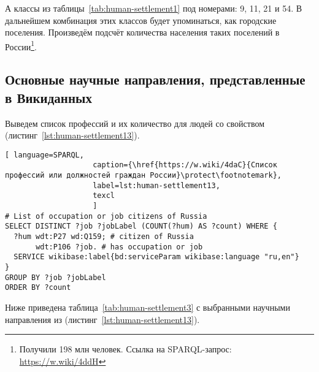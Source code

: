 А классы из таблицы~\ref{tab:human-settlement1} под номерами: 9, 11, 21 и 54. В дальнейшем комбинация этих классов будет упоминаться, как городские поселения. Произведём подсчёт количества населения таких поселений в России\footnote{Получили 198 млн человек. Ссылка на SPARQL-запрос: \href{https://w.wiki/4ddH}{https://w.wiki/4ddH}}.

\subsection{Основные научные направления, представленные в Викиданных}

Выведем список профессий и их количество для людей со свойством   (листинг~\protect\ref{lst:human-settlement13}). 

\lstset{numbers=left, firstnumber=1, frame=single}
\begin{lstlisting}[ language=SPARQL, 
                    caption={\href{https://w.wiki/4daC}{Список профессий или должностей граждан России}\protect\footnotemark},
                    label=lst:human-settlement13,
                    texcl 
                    ]
# List of occupation or job citizens of Russia 
SELECT DISTINCT ?job ?jobLabel (COUNT(?hum) AS ?count) WHERE {
  ?hum wdt:P27 wd:Q159; # citizen of Russia 
       wdt:P106 ?job. # has occupation or job
  SERVICE wikibase:label{bd:serviceParam wikibase:language "ru,en"}
}
GROUP BY ?job ?jobLabel
ORDER BY ?count
\end{lstlisting}%

Ниже приведена таблица~\ref{tab:human-settlement3} с выбранными научными направления из (листинг~\protect\ref{lst:human-settlement13}).

